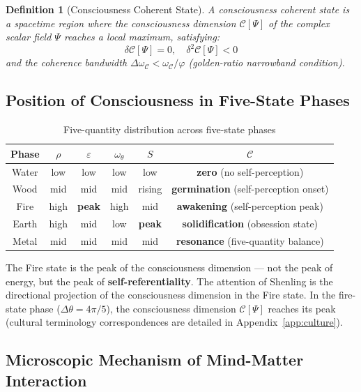 \documentclass[12pt,a4paper,twocolumn]{article}
\renewcommand{\phi}{\varphi}
\newtheorem{definition}[theorem]{Definition}
\begin{document}
\begin{definition}[Consciousness Coherent State]
A consciousness coherent state is a spacetime region where the consciousness dimension $\mathcal{C}[\Psi]$ of the complex scalar field $\Psi$ reaches a local maximum, satisfying:
\begin{equation}
\delta\mathcal{C}[\Psi] = 0, \quad \delta^2\mathcal{C}[\Psi] < 0
\end{equation}
and the coherence bandwidth $\Delta\omega_{\mathcal{C}} < \omega_{\mathcal{C}}/\phi$ (golden-ratio narrowband condition).
\end{definition}

\subsection{Position of Consciousness in Five-State Phases}

\begin{table}[H]
\centering
\footnotesize
\caption{Five-quantity distribution across five-state phases}
\begin{tabular}{c|c|c|c|c|c}
\hline
\textbf{Phase} & $\rho$ & $\varepsilon$ & $\omega_\theta$ & $S$ & $\mathcal{C}$ \\
\hline
Water & low & low & low & low & \textbf{zero} (no self-perception) \\
Wood & mid & mid & mid & rising & \textbf{germination} (self-perception onset) \\
Fire & high & \textbf{peak} & high & mid & \textbf{awakening} (self-perception peak) \\
Earth & high & mid & low & \textbf{peak} & \textbf{solidification} (obsession state) \\
Metal & mid & mid & mid & mid & \textbf{resonance} (five-quantity balance) \\
\hline
\end{tabular}
\end{table}

The Fire state is the peak of the consciousness dimension --- not the peak of energy, but the peak of \textbf{self-referentiality}. The attention of Shenling is the directional projection of the consciousness dimension in the Fire state. In the fire-state phase ($\Delta\theta=4\pi/5$), the consciousness dimension $\mathcal{C}[\Psi]$ reaches its peak (cultural terminology correspondences are detailed in Appendix~\ref{app:culture}).

\subsection{Microscopic Mechanism of Mind-Matter Interaction}
\end{document}
